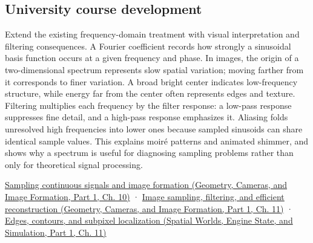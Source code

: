 \subsection{University course development}\label{appendix-b60686ba06a1-university-course-development}

\hypertarget{appendix-b60686ba06a1-university-course-development}{}

Extend the existing frequency-domain treatment with visual interpretation and filtering consequences. A Fourier coefficient records how strongly a sinusoidal basis function occurs at a given frequency and phase. In images, the origin of a two-dimensional spectrum represents slow spatial variation; moving farther from it corresponds to finer variation. A broad bright center indicates low-frequency structure, while energy far from the center often represents edges and texture. Filtering multiplies each frequency by the filter response: a low-pass response suppresses fine detail, and a high-pass response emphasizes it. Aliasing folds unresolved high frequencies into lower ones because sampled sinusoids can share identical sample values. This explains moiré patterns and animated shimmer, and shows why a spectrum is useful for diagnosing sampling problems rather than only for theoretical signal processing.

\href{../03-Geometry-Cameras-and-Image-Formation-P01/main.pdf\#03-visual-computing-i-ch003-sampling-continuous-signals-and-image-formation}{Sampling continuous signals and image formation (Geometry, Cameras, and Image Formation, Part 1, Ch. 10)} · \href{../03-Geometry-Cameras-and-Image-Formation-P01/main.pdf\#03-visual-computing-i-ch004-image-sampling-filtering-and-efficient-reconstruction}{Image sampling, filtering, and efficient reconstruction (Geometry, Cameras, and Image Formation, Part 1, Ch. 11)} · \href{../05-Spatial-Worlds-Engine-State-and-Simulation-P01/main.pdf\#04-visual-computing-ii-ch030-edges-contours-and-subpixel-localization}{Edges, contours, and subpixel localization (Spatial Worlds, Engine State, and Simulation, Part 1, Ch. 11)}
